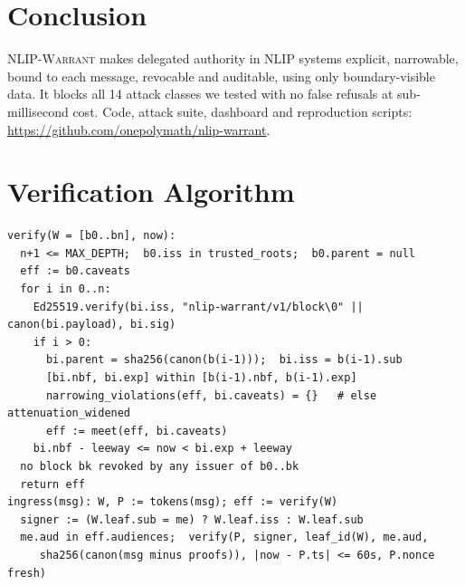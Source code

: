 \documentclass[sigconf,nonacm]{acmart}
\newcommand{\sys}{\textsc{NLIP-Warrant}}
\begin{document}
\section{Conclusion}
\sys{} makes delegated authority in NLIP systems explicit, narrowable, bound to each message, revocable and auditable, using only boundary-visible data. It blocks all 14 attack classes we tested with no false refusals at sub-millisecond cost. Code, attack suite, dashboard and reproduction scripts: \url{https://github.com/onepolymath/nlip-warrant}.




\appendix
{}
\section{Verification Algorithm}\label{app:alg}
\begin{lstlisting}
verify(W = [b0..bn], now):
  n+1 <= MAX_DEPTH;  b0.iss in trusted_roots;  b0.parent = null
  eff := b0.caveats
  for i in 0..n:
    Ed25519.verify(bi.iss, "nlip-warrant/v1/block\0" || canon(bi.payload), bi.sig)
    if i > 0:
      bi.parent = sha256(canon(b(i-1)));  bi.iss = b(i-1).sub
      [bi.nbf, bi.exp] within [b(i-1).nbf, b(i-1).exp]
      narrowing_violations(eff, bi.caveats) = {}   # else attenuation_widened
      eff := meet(eff, bi.caveats)
    bi.nbf - leeway <= now < bi.exp + leeway
  no block bk revoked by any issuer of b0..bk
  return eff
ingress(msg): W, P := tokens(msg); eff := verify(W)
  signer := (W.leaf.sub = me) ? W.leaf.iss : W.leaf.sub
  me.aud in eff.audiences;  verify(P, signer, leaf_id(W), me.aud,
     sha256(canon(msg minus proofs)), |now - P.ts| <= 60s, P.nonce fresh)
\end{lstlisting}
\end{document}
